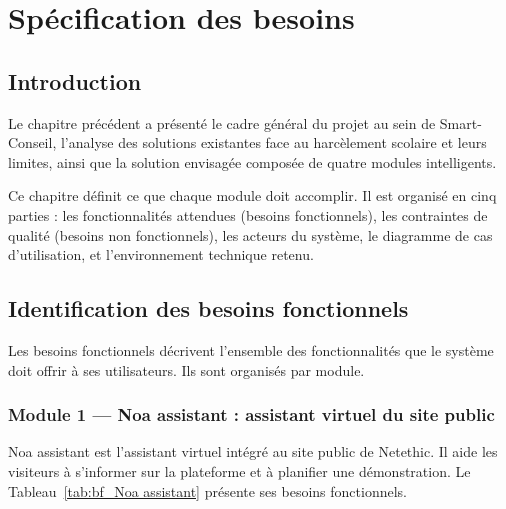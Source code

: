 \chapter{Spécification des besoins}

\section*{Introduction}

Le chapitre précédent a présenté le cadre général du projet au sein de Smart-Conseil,
l'analyse des solutions existantes face au harcèlement scolaire et leurs limites,
ainsi que la solution envisagée composée de quatre modules intelligents.

Ce chapitre définit ce que chaque module doit accomplir.
Il est organisé en cinq parties : les fonctionnalités attendues (besoins fonctionnels),
les contraintes de qualité (besoins non fonctionnels), les acteurs du système,
le diagramme de cas d'utilisation, et l'environnement technique retenu.

\section{Identification des besoins fonctionnels}

Les besoins fonctionnels décrivent l'ensemble des fonctionnalités que le système doit
offrir à ses utilisateurs. Ils sont organisés par module.

\subsection{Module 1 — Noa assistant : assistant virtuel du site public}

Noa assistant est l'assistant virtuel intégré au site public de Netethic.
Il aide les visiteurs à s'informer sur la plateforme et à planifier une démonstration.
Le Tableau~\ref{tab:bf_Noa assistant} présente ses besoins fonctionnels.

